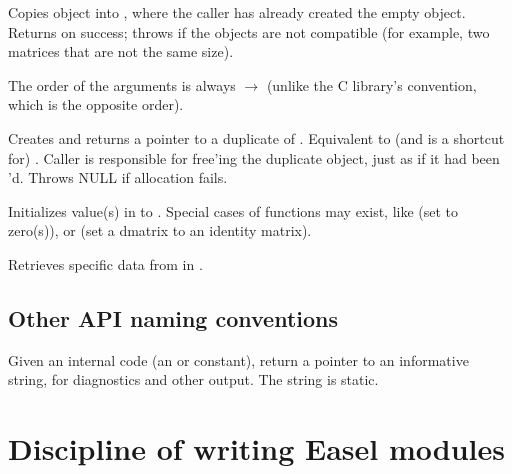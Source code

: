 \begin{sreitems}{}

\item[\ccode{\_Copy(src, dest)}]
Copies  object into , where the caller has
already created the empty  object. Returns 
on success; throws  if the objects are not
compatible (for example, two matrices that are not the same size).

The order of the arguments is always  $\rightarrow$
 (unlike the C library's  convention, which
is the opposite order).

\item[\ccode{\_Duplicate(obj)}] 

Creates and returns a pointer to a duplicate of .
Equivalent to (and is a shortcut for) . Caller is responsible for free'ing the duplicate
object, just as if it had been 'd. Throws NULL if
allocation fails.

\item[\ccode{\_Set*(obj, value...)}]

Initializes value(s) in  to . Special cases of
 functions may exist, like  (set to
zero(s)), or  (set a dmatrix to an
identity matrix).

\item[\ccode{\_Get*(obj...)}]

Retrieves specific data from in .
\end{sreitems}

\subsection{Other API naming conventions}
\begin{sreitems}{}

\item[\ccode{\_DescribeXXX()}]

Given an internal code (an  or  constant),
return a pointer to an informative string, for diagnostics and other
output. The string is static.

\end{sreitems}


\section{Discipline of writing Easel modules}


